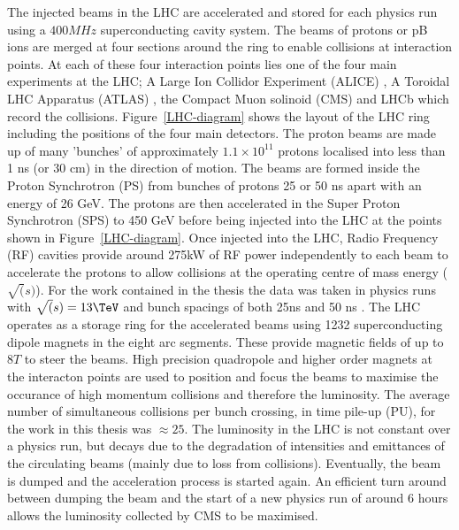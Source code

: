 The injected beams in the LHC are accelerated and stored for each physics run using 
a $400MHz$ superconducting cavity system. The beams of protons or pB ions 
are merged at four sections around the ring to enable collisions at interaction points.
At each of these four interaction points lies one of the four main 
experiments at the LHC; A Large Ion Collidor Experiment (ALICE) \cite{ALICE},
A Toroidal LHC Apparatus (ATLAS) \cite{ATLAS}, the Compact Muon solinoid (CMS) \cite{CMS}
and LHCb which record the collisions. Figure~\ref{LHC-diagram} shows the layout of the LHC ring including
the positions of the four main detectors. The proton beams are made up of many 'bunches' of approximately $1.1\times10^{11}$
protons localised into less than 1 ns (or 30 cm) in the direction of motion.
The beams are formed inside the Proton Synchrotron (PS) from bunches of protons 25 or 50 ns apart with an energy of 26 GeV. 
The protons are then accelerated in the Super Proton Synchrotron (SPS) to 450 GeV before being injected into the LHC at
the points shown in Figure~\ref{LHC-diagram}. Once injected into the LHC, Radio Frequency (RF) cavities 
provide around 275kW of RF power independently to each beam to accelerate the protons to allow collisions
at the operating centre of mass energy ($\sqrt(s)$). For the work contained in the thesis 
the data was taken in physics runs with $\sqrt(s) = 13\TeV$ and bunch spacings of both 25ns and 50 ns \cite{LHC}. 
The LHC operates as a storage ring for the accelerated beams using 1232 
superconducting dipole magnets in the eight arc segments. These provide magnetic fields of up to $8T$ to steer the beams. 
High precision quadropole and higher order magnets at the interacton points are used to position and focus the beams to 
maximise the occurance of high momentum collisions and therefore the luminosity. The average number of simultaneous collisions
per bunch crossing, in time pile-up (PU), for the work in this thesis was $\approx25$.
The luminosity in the LHC is not constant over a physics run, but decays due to the degradation 
of intensities and emittances of the circulating beams (mainly due to loss from collisions). Eventually,
the beam is dumped and the acceleration process is started again. An efficient turn around between
dumping the beam and the start of a new physics run of 
around 6 hours allows the luminosity collected by CMS to be maximised. 

